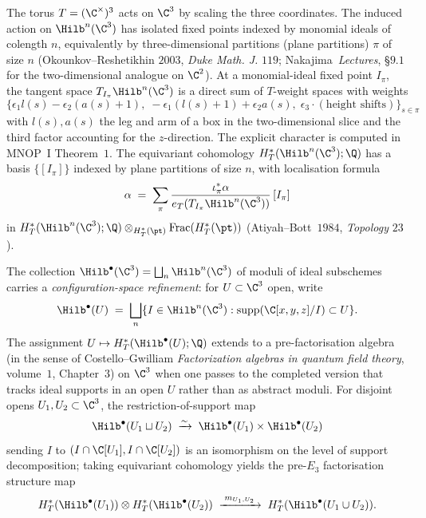 \begin{remark}
\label{rem:hilb-c3-torus-action}
The torus $T = (\C^\times)^3$ acts on $\C^3$ by scaling the three
coordinates. The induced action on $\Hilb^n(\C^3)$ has isolated fixed
points indexed by monomial ideals of colength $n$, equivalently by
three-dimensional partitions (plane partitions) $\pi$ of size $n$
(Okounkov--Reshetikhin $2003$, \textit{Duke Math. J.} $119$;
Nakajima~\textit{Lectures}, \S$9.1$ for the two-dimensional analogue
on $\C^2$). At a monomial-ideal fixed point $I_\pi$, the tangent space
$T_{I_\pi} \Hilb^n(\C^3)$ is a direct sum of $T$-weight spaces with
weights
\[
 \bigl\{\epsilon_1 l(s) - \epsilon_2 (a(s) + 1),\;
 -\epsilon_1 (l(s) + 1) + \epsilon_2 a(s),\;
 \epsilon_3 \cdot (\text{height shifts})\bigr\}_{s \in \pi}
\]
with $l(s), a(s)$ the leg and arm of a box in the two-dimensional
slice and the third factor accounting for the $z$-direction. The
explicit character is computed in MNOP~$\mathrm{I}$ Theorem~$1$. The
equivariant cohomology $H^*_T(\Hilb^n(\C^3); \Q)$ has a basis $\{[I_\pi]\}$
indexed by plane partitions of size $n$, with localisation formula
\[
 \alpha \;=\; \sum_\pi \frac{\iota_\pi^* \alpha}{e_T(T_{I_\pi} \Hilb^n(\C^3))}\, [I_\pi]
\]
in $H^*_T(\Hilb^n(\C^3); \Q) \otimes_{H^*_T(\pt)} \mathrm{Frac}(H^*_T(\pt))$
(Atiyah--Bott~$1984$, \textit{Topology} $23$).
\end{remark}

\begin{definition}
\label{def:prefactorization-hilb-c3}
\ClaimStatusDefinitional
The collection $\Hilb^\bullet(\C^3) = \bigsqcup_n \Hilb^n(\C^3)$ of
moduli of ideal subschemes carries a \emph{configuration-space
refinement}: for $U \subset \C^3$ open, write
\[
 \Hilb^\bullet(U) \;=\; \bigsqcup_n \{I \in \Hilb^n(\C^3)
 : \mathrm{supp}(\C[x, y, z] / I) \subset U\}.
\]
The assignment $U \mapsto H^*_T(\Hilb^\bullet(U); \Q)$ extends to a
pre-factorisation algebra (in the sense of Costello--Gwilliam
\textit{Factorization algebras in quantum field theory}, volume~$1$,
Chapter~$3$) on $\C^3$ when one passes to the completed version that
tracks ideal supports in an open $U$ rather than as abstract moduli.
For disjoint opens $U_1, U_2 \subset \C^3$, the restriction-of-support
map
\[
 \Hilb^\bullet(U_1 \sqcup U_2) \;\xrightarrow{\sim}\; \Hilb^\bullet(U_1)
 \times \Hilb^\bullet(U_2)
\]
sending $I$ to $(I \cap \C[U_1], I \cap \C[U_2])$ is an isomorphism on
the level of support decomposition; taking equivariant cohomology
yields the pre-$E_3$ factorisation structure map
\[
 H^*_T(\Hilb^\bullet(U_1)) \otimes H^*_T(\Hilb^\bullet(U_2))
 \;\xrightarrow{\;m_{U_1, U_2}\;}\;
 H^*_T(\Hilb^\bullet(U_1 \cup U_2)).
\]
\end{definition}

